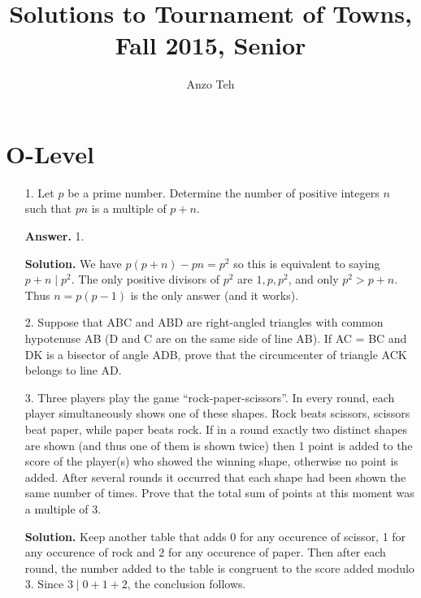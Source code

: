 \documentclass[11pt,a4paper]{article}
\begin{document}
\newcommand{\la}{\leftarrow}
\newcommand{\lra}{\leftrightarrow}
\newcommand{\bbN}{\mathbb{N}}
\newcommand{\bbZ}{\mathbb{Z}}
\newcommand{\dsum}{\displaystyle\sum}
\newcommand{\dprod}{\displaystyle\prod}


\title{Solutions to Tournament of Towns, Fall 2015, Senior}
\author{Anzo Teh}
\date{}
\maketitle

\section*{O-Level}
\begin{enumerate}
	\item[1.]
	Let $p$ be a prime number. Determine the number of positive integers $n$ such
	that $pn$ is a multiple of $p + n$.
	
	\textbf{Answer.} 1. 
	
	\textbf{Solution.} 
	We have $p(p+n)-pn = p^2$ so this is equivalent to saying $p+n\mid p^2$. 
	The only positive divisors of $p^2$ are $1, p, p^2$, 
	and only $p^2>p+n$. 
	Thus $n=p(p-1)$ is the only answer (and it works). 
	
	\item[2.]
	Suppose that ABC and ABD are right-angled triangles with common hypotenuse AB (D and C are on the same side of line AB). If AC = BC and
	DK is a bisector of angle ADB, prove that the circumcenter of triangle ACK
	belongs to line AD. 
	
	\item[3.]
	Three players play the game “rock-paper-scissors”. In every round, each player
	simultaneously shows one of these shapes. Rock beats scissors, scissors beat
	paper, while paper beats rock. If in a round exactly two distinct shapes are
	shown (and thus one of them is shown twice) then 1 point is added to the score
	of the player(s) who showed the winning shape, otherwise no point is added.
	After several rounds it occurred that each shape had been shown the same
	number of times. Prove that the total sum of points at this moment was a
	multiple of 3.
	
	\textbf{Solution.} Keep another table that adds 0 for any occurence of scissor, 
	1 for any occurence of rock and 2 for any occurence of paper. 
	Then after each round, the number added to the table is congruent to the score added modulo 3. 
	Since $3\mid 0+1+2$, the conclusion follows. 
	

\end{enumerate}
\end{document}
